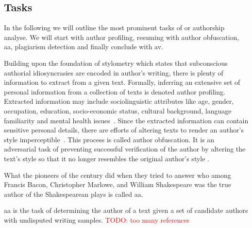 \subsection{Tasks}

In the following we will outline the most prominent tasks of \ai{} or authorship analyse.
We will start with author profiling, resuming with author obfuscation, \ac{aa}, plagiarism detection and finally conclude with \ac{av}.

Building upon the foundation of stylometry which states that subconscious authorial idiosyncrasies are encoded in author's writing, there is plenty of information to extract from a given text.
Formally, inferring an extensive set of personal information from a collection of texts is denoted author profiling.
Extracted information may include sociolinguistic attributes like age, gender, occupation, education, socio-economic status, cultural background, language familiarity and mental health issues~\citep{emmery_adversarial_2021,stamatatos_survey_2009,elmanarelbouanani_authorship_2014}.
Since the extracted information can contain sensitive personal details, there are efforts of altering texts to render an author's style imperceptible~\citep{bischoff_importance_2020}.
This process is called author obfuscation.
It is an adversarial task of preventing successful verification of the author by altering the text's style so that it no longer resembles the original author's style \citep{bevendorff_divergence_based_2020,gohsen_task_oriented_2024}.

What the \ai{} pioneers of the  century did when they tried to answer who among Francis Bacon, Christopher Marlowe, and William Shakespeare was the true author of the Shakespearean plays is called \ac{aa}.

\begin{definition}
    [\acl{aa}]   
    \ac{aa} is the task of determining the author of a text given a set of candidate authors with undisputed writing samples.
    \textcolor{red}{TODO: too many references}
\end{definition}

